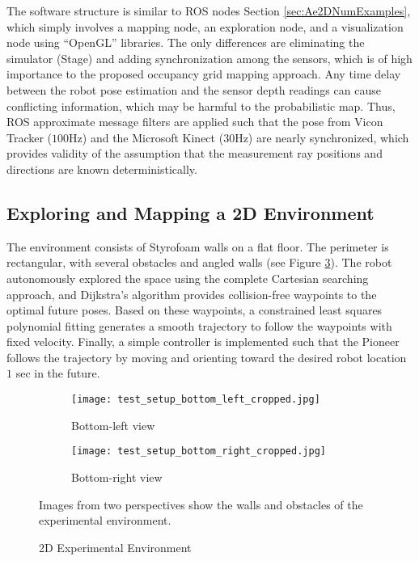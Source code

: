 The software structure is similar to ROS nodes Section \ref{sec:Ae2DNumExamples}, which simply involves a mapping node, an exploration node, and a visualization node using ``OpenGL'' libraries. The only differences are eliminating the simulator (Stage) and adding synchronization among the sensors, which is of high importance to the proposed occupancy grid mapping approach. Any time delay between the robot pose estimation and the sensor depth readings can cause conflicting information, which may be harmful to the probabilistic map. Thus, ROS approximate message filters are applied such that the pose from Vicon Tracker ($100$Hz) and the Microsoft Kinect ($30$Hz) are nearly synchronized, which provides validity of the assumption that the measurement ray positions and directions are known deterministically.

\subsection{Exploring and Mapping a 2D Environment}
The environment consists of Styrofoam walls on a flat floor. The perimeter is rectangular, with several obstacles and angled walls (see Figure \ref{fig:ExpSetupPhoto}). The robot autonomously explored the space using the complete Cartesian searching approach, and Dijkstra's algorithm provides collision-free waypoints to the optimal future poses. Based on these waypoints, a constrained least squares polynomial fitting generates a smooth trajectory to follow the waypoints with fixed velocity. Finally, a simple controller is implemented such that the Pioneer follows the trajectory by moving and orienting toward the desired robot location $1$ sec in the future.

\begin{figure}
	\centering
    	\begin{subfigure}[b]{0.45\textwidth}
        		\texttt{[image: test\_setup\_bottom\_left\_cropped.jpg]}
        		\caption{Bottom-left view}
        		\label{fig:Experiment_blv}
    	\end{subfigure}
	\hspace*{0.05\columnwidth}
	\begin{subfigure}[b]{0.45\textwidth}
        		\texttt{[image: test\_setup\_bottom\_right\_cropped.jpg]}
        		\caption{Bottom-right view}
        		\label{fig:Experiment_brv}
    	\end{subfigure}
\caption{2D Experimental Environment}
	\medskip
	\small
	Images from two perspectives show the walls and obstacles of the experimental environment.
\label{fig:ExpSetupPhoto}
\end{figure}


